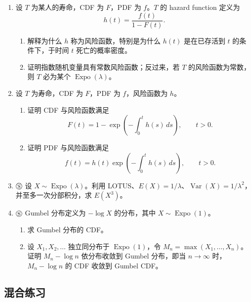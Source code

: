 \documentclass[UTF8, 12pt, fontset=fandol, oneside]{ctexart}
\begin{document}
\begin{enumerate}
  \item 设 $T$ 为某人的寿命，CDF 为 $F$，PDF 为 $f$。$T$ 的 hazard function 定义为
  \[
    h(t)=\frac{f(t)}{1-F(t)}.
  \]
  \begin{enumerate}
    \item 解释为什么 $h$ 称为风险函数，特别是为什么 $h(t)$ 是在已存活到 $t$ 的条件下，于时间 $t$ 死亡的概率密度。
    \item 证明指数随机变量具有常数风险函数；反过来，若 $T$ 的风险函数为常数，则 $T$ 必为某个 $\operatorname{Expo}(\lambda)$。
  \end{enumerate}

  \item 设 $T$ 为寿命，CDF 为 $F$，PDF 为 $f$，风险函数为 $h$。
  \begin{enumerate}
    \item 证明 CDF 与风险函数满足
    \[
      F(t)=1-\exp\left(-\int_0^t h(s)\,ds\right),\qquad t>0.
    \]
    \item 证明 PDF 与风险函数满足
    \[
      f(t)=h(t)\exp\left(-\int_0^t h(s)\,ds\right),\qquad t>0.
    \]
  \end{enumerate}

  \item $\circledS$ 设 $X\sim\operatorname{Expo}(\lambda)$。利用 LOTUS、$E(X)=1/\lambda$、$\operatorname{Var}(X)=1/\lambda^2$，并至多一次分部积分，求 $E(X^3)$。

  \item $\circledS$ Gumbel 分布定义为 $-\log X$ 的分布，其中 $X\sim\operatorname{Expo}(1)$。
  \begin{enumerate}
    \item 求 Gumbel 分布的 CDF。
    \item 设 $X_1,X_2,\ldots$ 独立同分布于 $\operatorname{Expo}(1)$，令 $M_n=\max(X_1,\ldots,X_n)$。证明 $M_n-\log n$ 依分布收敛到 Gumbel 分布，即当 $n\to\infty$ 时，$M_n-\log n$ 的 CDF 收敛到 Gumbel CDF。
  \end{enumerate}
\end{enumerate}

\subsection*{混合练习}
\end{document}
